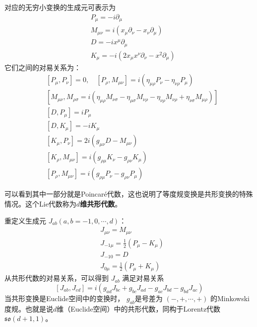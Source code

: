 	对应的无穷小变换的生成元可表示为
	\begin{equation}
		\boxed{
		\begin{aligned} &P_{\mu}=-i \partial_{\mu} \\ &M_{\mu \nu}=i\left(x_{\mu} \partial_{\nu}-x_{\nu} \partial_{\mu}\right) \\\ &D=-i x^{\mu} \partial_{\mu} \\ &K_{\mu}=-i\left(2 x_{\mu} x^{\nu} \partial_{\nu}-x^{2} \partial_{\mu}\right)  
		\end{aligned}
	}
	\end{equation}
	它们之间的对易关系为：
	\begin{equation}
		\boxed{
				\begin{aligned} 
					&[P_\mu,P_\nu]=0,\quad[P_\rho,M_{\mu\nu}]=i(\eta_{\mu\rho}P_\nu-\eta_{\nu\rho} P_\mu)\\
					&[M_{\mu\nu},M_{\rho\sigma}=i\left(\eta_{\mu\rho}M_{\nu\sigma}-\eta_{\mu\sigma}M_{\nu\rho}-\eta_{\nu\rho}M_{\nu\rho}+\eta_{\nu\sigma}M_{\mu\rho}\right)]\\
					&\left[D, P_{\mu}\right]=i P_{\mu}\\ &\left[D, K_{\mu}\right]=-i K_{\mu} \\ &\left[K_{\mu}, P_{\nu}\right]=2 i\left(g_{\mu \nu} D-M_{\mu \nu}\right) \\ &\left[K_{\rho}, M_{\mu \nu}\right]=i\left(g_{\rho \mu} K_{\nu}-g_{\rho \nu} K_{\mu}\right) \\ &\left[P_{\rho}, M_{\mu \nu}\right]=i\left(g_{\rho \mu} P_{\nu}-g_{\rho \nu} P_{\mu}\right) 
			\end{aligned}
		}
	\end{equation}
	
	可以看到其中一部分就是Poincar\'e代数，这也说明了等度规变换是共形变换的特殊情况。这个Lie代数称为\textbf{$ d $维共形代数}。
	
	重定义生成元 $J_{ab} (a,b=-1,0,\cdots,d )$：
	\begin{align} &J_{\mu \nu}=M_{\mu \nu}\\ &J_{-1 \mu}=\frac{1}{2}\left(P_{\mu}-K_{\mu}\right) \\ &J_{-10}=D \\ &J_{0 \mu}=\frac{1}{2}\left(P_{\mu}+K_{\mu}\right)  \end{align}
	从共形代数的对易关系，可以得到 $J_{ab}$ 满足对易关系
	\begin{equation}
		\left[J_{a b}, J_{c d}\right]=i\left(g_{a d} J_{b c}+g_{b c} J_{a d}-g_{a c} J_{b d}-g_{b d} J_{a c}\right)
	\end{equation}
	当共形变换是Euclide空间中的变换时， $g_{ab} $是号差为 $(-,+, \cdots,+)$ 的Minkowski度规。也就是说$d$维（Euclide空间）中的共形代数，同构于Lorentz代数$\mathfrak{so}(d+1,1) $。
	
